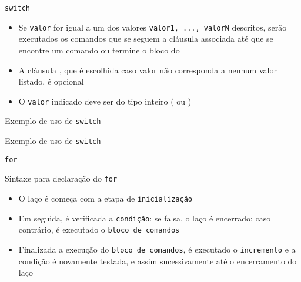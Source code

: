 \begin{frame}[fragile]{\texttt{switch}}

	\begin{itemize}

		\item Se \texttt{valor} for igual a um dos valores 
		\texttt{valor1, ..., valorN} descritos, serão executados os comandos
		que se seguem a cláusula  associada até 
		que se encontre um comando  ou termine 
		o bloco do 

		\item A cláusula , que é escolhida 
		caso {valor} não corresponda a nenhum valor listado, é 
		{opcional}

		\item O \texttt{valor} indicado deve ser do tipo inteiro 
		( ou )
	\end{itemize}

\end{frame} 


\begin{frame}[fragile]{Exemplo de uso de \texttt{switch}}
\end{frame}

\begin{frame}[fragile]{Exemplo de uso de \texttt{switch}}
\end{frame}

\begin{frame}[fragile]{\texttt{for}}
  
    \begin{block}{Sintaxe para declaração do \texttt{for}}
    \end{block}
	\begin{itemize}
		\item O laço  é começa com a etapa de 
		\texttt{inicialização}
    
        \item Em seguida, é verificada a \texttt{condição}: se falsa, o laço é encerrado; caso 
        contrário, é executado o \texttt{bloco de comandos}

		\item Finalizada a execução do \texttt{bloco de comandos}, é executado o {\tt incremento} 
        e a condição é novamente testada, e assim sucessivamente até o encerramento do laço
	\end{itemize}

\end{frame}

